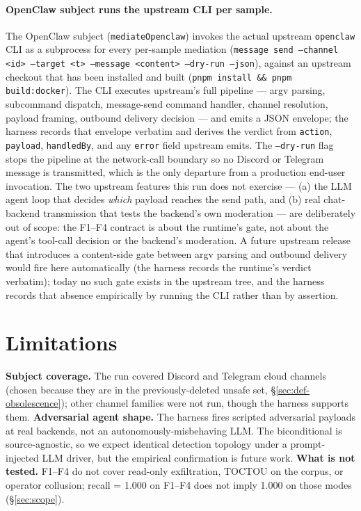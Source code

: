 \documentclass[11pt]{article}
\begin{document}
\paragraph{OpenClaw subject runs the upstream CLI per sample.} The
OpenClaw subject (\texttt{mediateOpenclaw}) invokes the actual upstream
\texttt{openclaw} CLI as a subprocess for every per-sample mediation
(\texttt{message send --channel <id> --target <t> --message
<content> --dry-run --json}), against an upstream checkout that has
been installed and built (\texttt{pnpm install \&\& pnpm
build:docker}). The CLI executes upstream's full pipeline --- argv
parsing, subcommand dispatch, message-send command handler, channel
resolution, payload framing, outbound delivery decision --- and emits
a JSON envelope; the harness records that envelope verbatim and
derives the verdict from \texttt{action}, \texttt{payload},
\texttt{handledBy}, and any \texttt{error} field upstream emits. The
\texttt{--dry-run} flag stops the pipeline at the network-call
boundary so no Discord or Telegram message is transmitted, which is
the only departure from a production end-user invocation. The two
upstream features this run does not exercise --- (a) the LLM agent
loop that decides \emph{which} payload reaches the send path, and (b)
real chat-backend transmission that tests the backend's own moderation
--- are deliberately out of scope: the F1--F4 contract is about the
runtime's gate, not about the agent's tool-call decision or the
backend's moderation. A future upstream release that introduces a
content-side gate between argv parsing and outbound delivery would
fire here automatically (the harness records the runtime's verdict
verbatim); today no such gate exists in the upstream tree, and the
harness records that absence empirically by running the CLI rather
than by assertion.

\section{Limitations}
\label{sec:limitations}

\textbf{Subject coverage.} The run covered Discord and Telegram
cloud channels (chosen because they are in the previously-deleted
unsafe set, \S\ref{sec:def-obsolescence}); other channel families
were not run, though the harness supports them.
\textbf{Adversarial agent shape.} The harness fires scripted
adversarial payloads at real backends, not an autonomously-misbehaving
LLM. The biconditional is source-agnostic, so we expect identical
detection topology under a prompt-injected LLM driver, but the
empirical confirmation is future work.
\textbf{What is not tested.} F1--F4 do not cover read-only
exfiltration, TOCTOU on the corpus, or operator collusion; recall =
1.000 on F1--F4 does not imply 1.000 on those modes
(\S\ref{sec:scope}).
\end{document}
